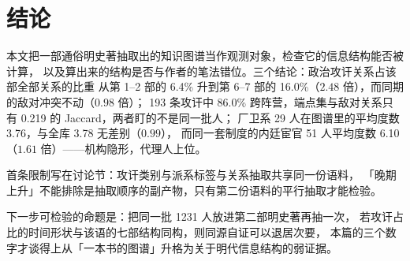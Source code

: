 \section{结论}

本文把一部通俗明史著抽取出的知识图谱当作观测对象，检查它的信息结构能否被计算，
以及算出来的结构是否与作者的笔法错位。三个结论：政治攻讦关系占该部全部关系的比重
从第 1--2 部的 6.4\% 升到第 6--7 部的 16.0\%（$2.48$ 倍），而同期的敌对冲突不动（$0.98$ 倍）；
193 条攻讦中 86.0\% 跨阵营，端点集与敌对关系只有 0.219 的 Jaccard，两者盯的不是同一批人；
厂卫系 29 人在图谱里的平均度数 3.76，与全库 3.78 无差别（$0.99$），
而同一套制度的内廷宦官 51 人平均度数 6.10（$1.61$ 倍）——机构隐形，代理人上位。

首条限制写在讨论节：攻讦类别与派系标签与关系抽取共享同一份语料，
「晚期上升」不能排除是抽取顺序的副产物，只有第二份语料的平行抽取才能检验。

下一步可检验的命题是：把同一批 1231 人放进第二部明史著再抽一次，
若攻讦占比的时间形状与该语的七部结构同构，则同源自证可以退居次要，
本篇的三个数字才谈得上从「一本书的图谱」升格为关于明代信息结构的弱证据。

